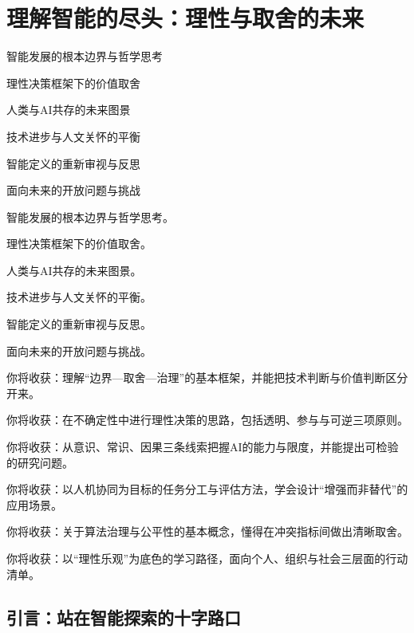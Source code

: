 \chapter{理解智能的尽头：理性与取舍的未来}

\begin{introduction}
\item 智能发展的根本边界与哲学思考
\item 理性决策框架下的价值取舍
\item 人类与AI共存的未来图景
\item 技术进步与人文关怀的平衡
\item 智能定义的重新审视与反思
\item 面向未来的开放问题与挑战
\end{introduction}
\begin{introduction}
\item 智能发展的根本边界与哲学思考。
\item 理性决策框架下的价值取舍。
\item 人类与AI共存的未来图景。
\item 技术进步与人文关怀的平衡。
\item 智能定义的重新审视与反思。
\item 面向未来的开放问题与挑战。
\end{introduction}

\begin{introduction}
\item 你将收获：理解“边界—取舍—治理”的基本框架，并能把技术判断与价值判断区分开来。
\item 你将收获：在不确定性中进行理性决策的思路，包括透明、参与与可逆三项原则。
\item 你将收获：从意识、常识、因果三条线索把握AI的能力与限度，并能提出可检验的研究问题。
\item 你将收获：以人机协同为目标的任务分工与评估方法，学会设计“增强而非替代”的应用场景。
\item 你将收获：关于算法治理与公平性的基本概念，懂得在冲突指标间做出清晰取舍。
\item 你将收获：以“理性乐观”为底色的学习路径，面向个人、组织与社会三层面的行动清单。
\end{introduction}



\section{引言：站在智能探索的十字路口}

